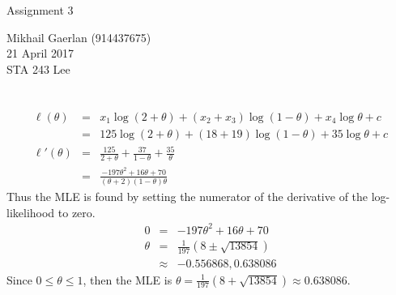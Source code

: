 \documentclass[11pt]{article}
\begin{document}
\begin{multicols}{2}
  \phantom{hello}\vspace{\baselineskip}
  \phantom{hello}\vspace{\baselineskip}
  {\large Assignment 3}\\
  \begin{flushright}
    Mikhail Gaerlan (914437675)\\
    21 April 2017\\
    STA 243 Lee
  \end{flushright}
\end{multicols}
\vspace{-1.3\baselineskip}

\hrulefill

\section{}

\subsection{}
\begin{eqnarray*}
  \ell(\theta)&=&x_1\log\left(2+\theta\right)+\left(x_2+x_3\right)\log\left(1-\theta\right)+x_4\log\theta+c\\
              &=&125\log\left(2+\theta\right)+\left(18+19\right)\log\left(1-\theta\right)+35\log\theta+c\\
  \ell'(\theta)&=&\frac{125}{2+\theta}+\frac{37}{1-\theta }+\frac{35}{\theta }\\
              &=&\frac{-197 \theta ^2+16 \theta +70}{(\theta +2)(1-\theta) \theta }
\end{eqnarray*}
Thus the MLE is found by setting the numerator of the derivative of the log-likelihood to zero.
\begin{eqnarray*}
  0&=&-197 \theta ^2+16 \theta +70\\
  \theta&=&\frac{1}{197} \left(8\pm\sqrt{13854}\right)\\
   &\approx&-0.556868,0.638086
\end{eqnarray*}
Since $0\leq\theta\leq1$, then the MLE is $\theta=\frac{1}{197} \left(8+\sqrt{13854}\right)\approx0.638086$.

\subsection{}
\end{document}
